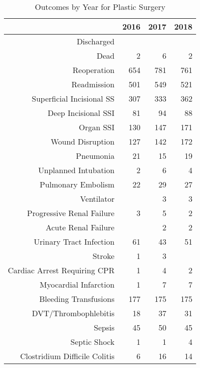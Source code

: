 \begin{table}[ht]
\centering
\begin{tabular}{rrrr}
  \hline
 & 2016 & 2017 & 2018 \\ 
  \hline
Discharged &  &  &  \\ 
  Dead &   2 &   6 &   2 \\ 
  Reoperation & 654 & 781 & 761 \\ 
  Readmission & 501 & 549 & 521 \\ 
  Superficial Incisional SS & 307 & 333 & 362 \\ 
  Deep Incisional SSI &  81 &  94 &  88 \\ 
  Organ SSI & 130 & 147 & 171 \\ 
  Wound Disruption & 127 & 142 & 172 \\ 
  Pneumonia &  21 &  15 &  19 \\ 
  Unplanned Intubation &   2 &   6 &   4 \\ 
  Pulmonary Embolism &  22 &  29 &  27 \\ 
  Ventilator &  &   3 &   3 \\ 
  Progressive Renal Failure &   3 &   5 &   2 \\ 
  Acute Renal Failure &  &   2 &   2 \\ 
  Urinary Tract Infection &  61 &  43 &  51 \\ 
  Stroke &   1 &   3 &  \\ 
  Cardiac Arrest Requiring CPR &   1 &   4 &   2 \\ 
  Myocardial Infarction &   1 &   7 &   7 \\ 
  Bleeding Transfusions & 177 & 175 & 175 \\ 
  DVT/Thrombophlebitis &  18 &  37 &  31 \\ 
  Sepsis &  45 &  50 &  45 \\ 
  Septic Shock &   1 &   1 &   4 \\ 
  Clostridium Difficile Colitis &   6 &  16 &  14 \\ 
   \hline
\end{tabular}
\caption{Outcomes by Year for Plastic Surgery} 
\end{table}
